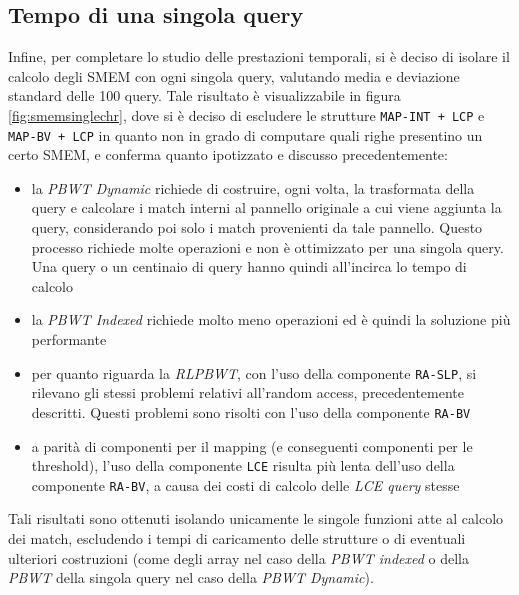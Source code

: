 \subsection{Tempo di una singola query}
Infine, per completare lo studio delle prestazioni temporali, si è deciso di
isolare il calcolo degli SMEM con ogni singola query, valutando media e
deviazione standard delle 100 query. Tale risultato è visualizzabile in figura
\ref{fig:smemsinglechr}, dove si è deciso di escludere le strutture
\texttt{MAP-INT + LCP} e \texttt{MAP-BV + LCP} in quanto non in grado di
computare quali righe presentino un certo SMEM, e conferma quanto ipotizzato e
discusso precedentemente: 
\begin{itemize}
  \item la \textit{PBWT Dynamic} richiede di costruire, ogni volta, la
  trasformata della query e
  calcolare i match interni al pannello originale a cui viene
  aggiunta la query, considerando poi solo i match provenienti da tale
  pannello. Questo processo richiede molte operazioni e non è ottimizzato per 
  una singola query. Una query o un centinaio di query hanno quindi all'incirca
  lo tempo di calcolo
  \item la \textit{PBWT Indexed} richiede molto meno operazioni ed è quindi la
  soluzione più performante
  \item per quanto riguarda la \textit{RLPBWT}, con l'uso della componente
  \texttt{RA-SLP}, si rilevano gli stessi problemi relativi all'random access,
  precedentemente 
  descritti. Questi problemi sono risolti con l'uso della componente
  \texttt{RA-BV} 
  \item a parità di componenti per il mapping (e conseguenti componenti per le
  threshold), l'uso della componente \texttt{LCE} risulta più lenta dell'uso
  della componente \texttt{RA-BV}, a causa dei costi di calcolo delle
  \textit{LCE query} stesse 
\end{itemize}
Tali risultati sono ottenuti isolando unicamente le singole funzioni atte al
calcolo dei match, escludendo i tempi di caricamento delle strutture o di
eventuali ulteriori costruzioni (come degli array nel caso della \textit{PBWT
  indexed} o della \textit{PBWT} della singola query nel caso della \textit{PBWT
Dynamic}).
